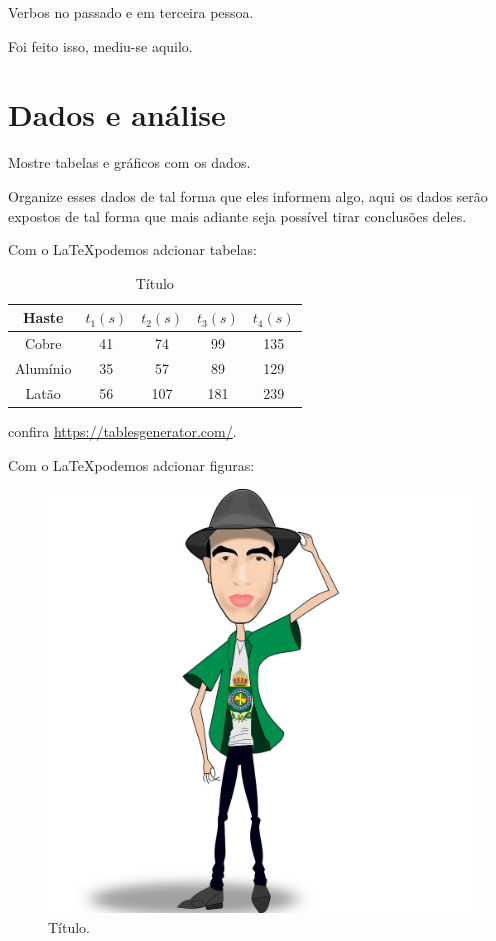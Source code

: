\documentclass[
   12pt,                         %
   openright,                    %
   oneside,                      %
   a4paper,                      %
   sumario = tradicional,        %
   chapter=TITLE,                %
   section=TITLE,                %
   subsection=TITLE,             %
   subsubsection=TITLE,          %
   english,                      %
   french,                       %
   spanish,                      %
   brazil,                       %
   xcolor=table                  %
]{abntex2}
\begin{document}
      Verbos no passado e em terceira pessoa.

      Foi feito isso, mediu-se aquilo.

      {\let\clearpage\relax 
   \chapter{Dados e análise}
      \vspace{0.5cm}}

      Mostre tabelas e gráficos com os dados.

      Organize esses dados de tal forma que eles informem algo, aqui os dados serão expostos de tal forma que mais adiante seja possível tirar conclusões deles.

      Com o \LaTeX  podemos adcionar tabelas:

      \begin{table}[H]
         \centering
         \caption{\label{tab:part1}\footnotesize Título}
         \begin{tabular}{c|cccc}
            Haste    & $t_1(s)$ & $t_2(s)$ & $t_3(s)$ & $t_4(s)$ \\ \hline
            Cobre    & 41       & 74       & 99       & 135      \\
            Alumínio & 35       & 57       & 89       & 129      \\
            Latão    & 56       & 107      & 181      & 239     
         \end{tabular}
      \end{table}

      \noindent confira \url{https://tablesgenerator.com/}.

      Com o \LaTeX  podemos adcionar figuras:

      \begin{figure}[H]
         \centering
         \caption{\label{fig:coordenadas}\footnotesize Título.}
         \includegraphics[scale=0.2]{img/NomeDoArquivo}
      \end{figure}
\end{document}
